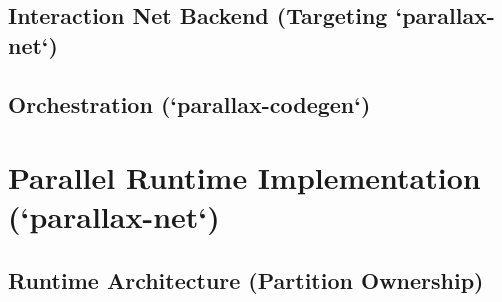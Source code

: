 \subsection{Interaction Net Backend (Targeting `parallax-net`)}

\subsection{Orchestration (`parallax-codegen`)}

\section{Parallel Runtime Implementation (`parallax-net`)}

\subsection{Runtime Architecture (Partition Ownership)}

